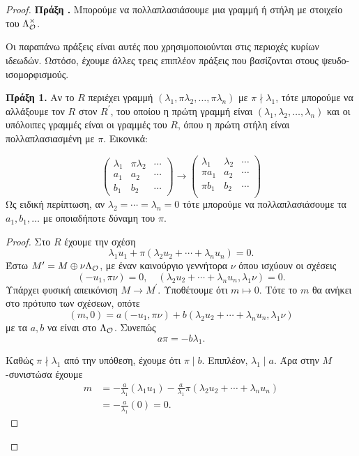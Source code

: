 \begin{proof}
\noindent \textbf{Πράξη .} Μπορούμε να πολλαπλασιάσουμε μια γραμμή ή στήλη με στοιχείο του $\Lambda_\mathcal{O}^\times$.

\noindent Οι παραπάνω πράξεις είναι αυτές που χρησιμοποιούνται στις περιοχές κυρίων ιδεωδών. Ωστόσο, έχουμε άλλες τρεις επιπλέον πράξεις που βασίζονται στους ψευδο-ισομορφισμούς.


\noindent \textbf{Πράξη 1.}  Αν το $R$ περιέχει γραμμή $(\lambda_1,\pi \lambda_2,\ldots, \pi \lambda_n)$ με $\pi \nmid \lambda_1$, τότε μπορούμε να αλλάξουμε τον $R$ στον $R^\prime$, του οποίου η πρώτη γραμμή είναι $(\lambda_1,\lambda_2,\ldots,\lambda_n)$ και οι υπόλοιπες γραμμές είναι οι γραμμές του $R$, όπου η πρώτη στήλη είναι πολλαπλασιασμένη με $\pi$. Εικονικά:

$$\begin{pmatrix}
    \lambda_1 & \pi \lambda_2 & \cdots \\
    a_1 & a_2 & \cdots \\
    b_1 & b_2 & \cdots
\end{pmatrix} \longrightarrow \begin{pmatrix}
    \lambda_1 & \lambda_2 & \cdots \\
    \pi a_1 & a_2 & \cdots \\
    \pi b_1 & b_2 & \cdots \\
\end{pmatrix}$$
\noindent Ως ειδική περίπτωση, αν $\lambda_2 = \cdots = \lambda_n = 0$ τότε μπορούμε να πολλαπλασιάσουμε τα $a_1,b_1,\ldots$ με οποιαδήποτε δύναμη του $\pi$.
\begin{proof}
    Στο $R$ έχουμε την σχέση
    $$\lambda_1 u_1 + \pi(\lambda_2 u_2 + \cdots + \lambda_n u_n) = 0.$$
    Έστω $M^\prime = M\oplus \nu \Lambda_\mathcal{O}$, με έναν καινούργιο γεννήτορα $\nu$ όπου ισχύουν οι σχέσεις
    $$(-u_1,\pi \nu) = 0, \quad (\lambda_2 u_2 + \cdots + \lambda_n u_n, \lambda_1 \nu) = 0.$$
    Υπάρχει φυσική απεικόνιση $M\rightarrow M^\prime$. Υποθέτουμε ότι $m\mapsto 0$. Τότε το $m$ θα ανήκει στο πρότυπο των σχέσεων, οπότε
    $$(m,0) = a(-u_1,\pi\nu) + b(\lambda_2 u_2 + \cdots + \lambda_n u_n, \lambda_1 \nu)$$ με τα $a,b$ να είναι στο $\Lambda_\mathcal{O}$. Συνεπώς
    $$a\pi = -b \lambda_1.$$

    \noindent Καθώς $\pi \nmid \lambda_1$ από την υπόθεση, έχουμε ότι $\pi \mid b$. Επιπλέον, $\lambda_1 \mid a$. Άρα στην $M$-συνιστώσα έχουμε
    \begin{align*}
    m &= -\frac{a}{\lambda_1} (\lambda_1 u_1) - \frac{a}{\lambda_1} \pi(\lambda_2 u_2 + \cdots + \lambda_n u_n) \\
    &= -\frac{a}{\lambda_1}(0) = 0.
    \end{align*}


\end{proof}
\end{proof}
